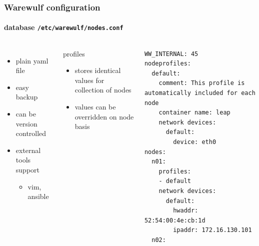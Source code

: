 \documentclass[aspectratio=169]{beamer}
\begin{document}
\begin{frame}[fragile]
\frametitle{Warewulf configuration}
\framesubtitle{database \texttt{/etc/warewulf/nodes.conf}}
\begin{columns}
\begin{itemize}
  \item plain yaml file
  \item easy backup
  \item can be version controlled
  \item external tools support
  \begin{itemize}
    \item vim, ansible
  \end{itemize}
\end{itemize}
\begin{block}{profiles}
\begin{itemize}
  \item stores identical values for collection of nodes
  \item values can be overridden on node basis
\end{itemize}
\end{block}
\begin{lstlisting}[style=yaml]
WW_INTERNAL: 45
nodeprofiles:
  default:
    comment: This profile is automatically included for each node
    container name: leap
    network devices:
      default:
        device: eth0
nodes:
  n01:
    profiles:
    - default
    network devices:
      default:
        hwaddr: 52:54:00:4e:cb:1d
        ipaddr: 172.16.130.101
  n02:
\end{lstlisting}
%
\end{columns}
\end{frame}
\end{document}
